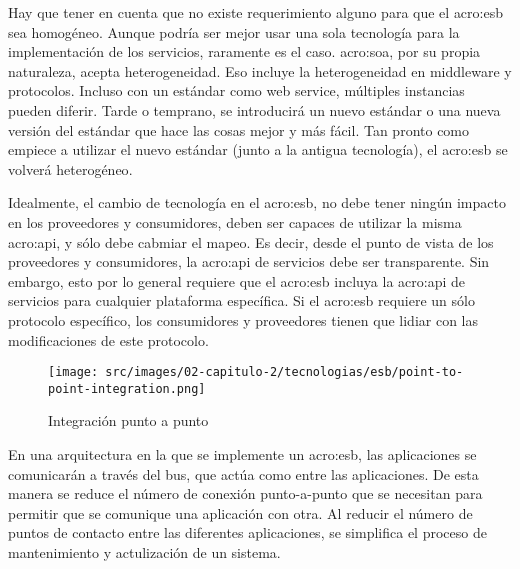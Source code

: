 Hay que tener en cuenta que no existe requerimiento alguno para que el \gls{acro:esb} sea homogéneo.  Aunque podría ser mejor usar una sola tecnología para la implementación de los servicios, raramente es el caso. \gls{acro:soa}, por su propia naturaleza, acepta heterogeneidad. Eso incluye la heterogeneidad en middleware y protocolos. Incluso con un estándar como web service, múltiples instancias pueden diferir.  Tarde o temprano, se introducirá un nuevo estándar o una nueva versión del estándar que hace las cosas mejor y más fácil. Tan pronto como empiece a utilizar el nuevo estándar (junto a la antigua tecnología), el \gls{acro:esb} se volverá heterogéneo\cite[p.~49]{josuttis2007}.

Idealmente, el cambio de tecnología en el \gls{acro:esb}, no debe tener ningún impacto en los proveedores y consumidores, deben ser capaces de utilizar la misma \gls{acro:api}, y sólo debe cabmiar el mapeo.
Es decir, desde el punto de vista de los proveedores y consumidores, la \gls{acro:api} de servicios debe ser transparente. Sin embargo, esto por lo general requiere que el \gls{acro:esb} incluya la \gls{acro:api} de servicios para cualquier plataforma específica. Si el \gls{acro:esb} requiere un sólo protocolo específico, los consumidores y proveedores tienen que lidiar con las modificaciones de este protocolo\cite[p.~50]{josuttis2007}.


\begin{figure}[H]
  \texttt{[image: src/images/02-capitulo-2/tecnologias/esb/point-to-point-integration.png]}
  \caption{Integración punto a punto}
  \label{fig:point-to-point-integration}
\end{figure}


En una arquitectura en la que se implemente un \gls{acro:esb}, las aplicaciones se comunicarán a través del bus, que actúa como  entre las aplicaciones. De esta manera se reduce el número de conexión punto-a-punto que se necesitan para permitir que se comunique una aplicación con otra.  Al reducir el número de puntos de contacto entre las diferentes aplicaciones, se simplifica el proceso de mantenimiento y actulización de un sistema.


